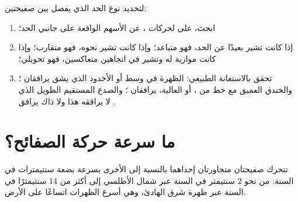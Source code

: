\begin{method}\label{met:g7:plate-tectonics:recognise}
لتحديد نوع الحد الذي يفصل بين صفيحتين:
\begin{enumerate}
  \item ابحث، على  لحركات ، عن الأسهم الواقعة على جانبي
        الحد؛
  \item إذا كانت تشير بعيدًا عن الحد، فهو متباعد؛ وإذا كانت
        تشير نحوه، فهو متقارب؛ وإذا كانت موازية له وتشير
        في اتجاهين متعاكسين، فهو تحويلي؛
  \item تحقق بالاستعانة  الطبيعي: الظهرة في وسط  أو
        الأخدود الذي يشق  يرافقان ؛ والخندق العميق
        مع خط من ، أو  العالية، يرافقان ؛ والصدع المستقيم الطويل الذي لا يرافقه هذا ولا ذاك يرافق .
\end{enumerate}
\end{method}

\section{ما سرعة حركة الصفائح؟}

\begin{proposition}\label{prop:g7:plate-tectonics:speed}
تتحرك صفيحتان متجاورتان إحداهما بالنسبة إلى الأخرى بسرعة بضعة
سنتيمترات في السنة: من نحو 2 سنتيمتر في السنة عبر
شمال الأطلسي إلى أكثر من 14 سنتيمترًا في السنة عبر ظهرة شرق 
الهادئ، وهي أسرع الظهرات اتساعًا على الأرض.
\end{proposition}


